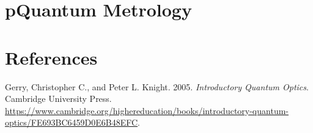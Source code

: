 \documentclass[
  letterpaper,
  DIV=11,
  numbers=noendperiod]{scrreprt}
\newlength{\cslhangindent}
\newenvironment{CSLReferences}[2] %
 {\begin{list}{}{%
  \setlength{\itemindent}{0pt}
  \setlength{\leftmargin}{0pt}
  \setlength{\parsep}{0pt}
  \ifodd #1
   \setlength{\leftmargin}{\cslhangindent}
   \setlength{\itemindent}{-1\cslhangindent}
  \fi
  \setlength{\itemsep}{#2\baselineskip}}}
 {\end{list}}
\begin{document}


\chapter*{pQuantum Metrology}\label{pquantum-metrology}



\chapter*{References}\label{references}


\label{refs}
\begin{CSLReferences}{1}{0}
Gerry, Christopher C., and Peter L. Knight. 2005. \emph{Introductory
Quantum Optics}. Cambridge University Press.
\url{https://www.cambridge.org/highereducation/books/introductory-quantum-optics/FE693BC6459D0E6B48EFC}.

\end{CSLReferences}
\end{document}
